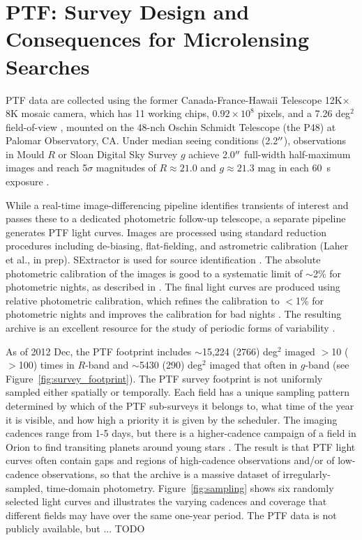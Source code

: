 \documentclass{emulateapj}
\begin{document}
\section{PTF: Survey Design and Consequences for Microlensing Searches}\label{sec:ptf} 
PTF data are collected using the former Canada-France-Hawaii Telescope 12K$\times$8K mosaic camera, which has 11 working chips, $0.92\times10^8$ pixels, and a 7.26 deg$^2$ field-of-view \citep{rahmer2008}, mounted on the 48-nch Oschin Schmidt Telescope (the P48) at Palomar Observatory, CA. Under median seeing conditions (2.2$\mbox{$^{\prime\prime}$}$), observations in Mould $R$ or Sloan Digital Sky Survey \citep[SDSS;][]{york00} $g$ achieve 2.0$\mbox{$^{\prime\prime}$}$ full-width half-maximum images and reach 5$\sigma$ magnitudes of $R \approx 21.0$ and $g \approx 21.3$ mag in each 60~s exposure \citep{nick2009,rau2009,nick2010}. 

While a real-time image-differencing pipeline identifies transients of interest and passes these to a dedicated photometric follow-up telescope, a separate pipeline generates PTF light curves. Images are processed using standard reduction procedures including de-biasing, flat-fielding, and astrometric calibration (Laher et al., in prep). SExtractor is used for source identification \citep{bertin96}. The absolute photometric calibration of the images is good to a systematic limit of $\sim$2\% for photometric nights, as described in \cite{ofek2012}.  The final light curves are produced using relative photometric calibration, which refines the calibration to $<$1\% for photometric nights and improves the calibration for bad nights \citep[Levitan et al., in prep; for algorithm details see][]{levitan2011, ofek2012}. The resulting archive is an excellent resource for the study of periodic forms of variability \citep[e.g., stellar or asteroid rotation;][]{agueros11,polishook2012}. 

As of 2012 Dec, the PTF footprint includes $\sim$15,224 (2766) deg$^2$ imaged $>$10 ($>$100) times in $R$-band and $\sim$5430 (290) deg$^2$ imaged that often in $g$-band (see Figure~\ref{fig:survey_footprint}). The PTF survey footprint is not uniformly sampled either spatially or temporally. Each field has a unique sampling pattern determined by which of the PTF sub-surveys it belongs to, what time of the year it is visible, and how high a priority it is given by the scheduler. The imaging cadences range from 1-5 days, but there is a higher-cadence campaign of a field in Orion to find transiting planets around young stars \citep{nick2009}. The result is that PTF light curves often contain gaps and regions of high-cadence observations and/or of low-cadence observations, so that the archive is a massive dataset of irregularly-sampled, time-domain photometry. Figure~\ref{fig:sampling} shows six randomly selected light curves and illustrates the varying cadences and coverage that different fields may have over the same one-year period. The PTF data is not publicly available, but ... TODO
\end{document}
